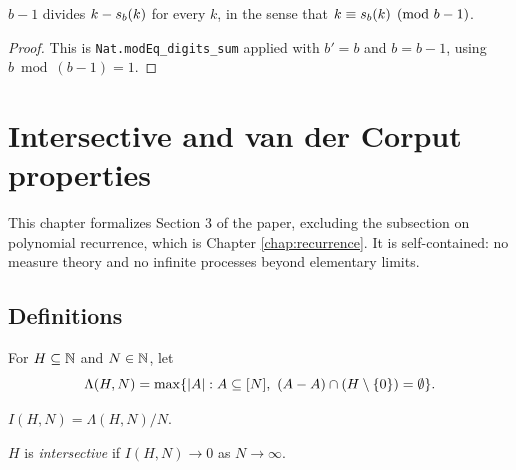 \begin{lemma}
  \label{lem:b-sub-one-dvd}
  \leanok
  $b - 1$ divides $k - s_b(k)$ for every $k$, in the sense that
  $k \equiv s_b(k) \pmod{b-1}$.
\end{lemma}
\begin{proof}
  \leanok
  This is \texttt{Nat.modEq\_digits\_sum} applied with $b' = b$ and $b = b-1$,
  using $b \bmod (b-1) = 1$.
\end{proof}

\chapter{Intersective and van der Corput properties}
\label{chap:vdc}

This chapter formalizes Section 3 of the paper, excluding the subsection on
polynomial recurrence, which is Chapter \ref{chap:recurrence}. It is
self-contained: no measure theory and no infinite processes beyond elementary
limits.

\section{Definitions}

\begin{definition}
  \label{def:maxAvoiding}
  \leanok
  For $H \subseteq \mathbb{N}$ and $N \in \mathbb{N}$, let
  \[
    \Lambda(H, N) = \max \{\left\lvert A \right\rvert : A \subseteq [N], \ (A - A) \cap
      (H \setminus \{0\}) = \emptyset \} .
  \]
\end{definition}

\begin{definition}
  \label{def:intersectiveConst}
  \leanok
  $I(H,N) = \Lambda(H,N)/N$.
\end{definition}

\begin{definition}[Intersective]
  \label{def:isIntersective}
  \leanok
  $H$ is \emph{intersective} if $I(H,N) \to 0$ as $N \to \infty$.
\end{definition}

